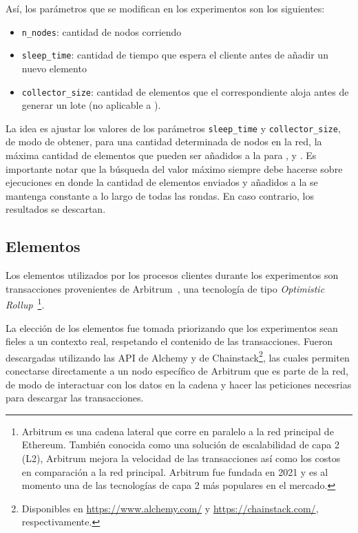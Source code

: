 \bigskip

Así, los parámetros que se modifican en los experimentos son los siguientes:
\begin{itemize}
	\item \texttt{n\_nodes}: cantidad de nodos corriendo
	\item \texttt{sleep\_time}: cantidad de tiempo que espera el cliente antes de añadir un nuevo elemento
	\item \texttt{collector\_size}: cantidad de elementos que el correspondiente \collector aloja antes de generar
	un lote (no aplicable a \vanilla).
\end{itemize}
La idea es ajustar los valores de los parámetros \texttt{sleep\_time} y \texttt{collector\_size},
de modo de obtener, para una cantidad determinada de nodos en la red, la máxima cantidad de elementos que pueden ser
añadidos a la \setchain para \vanilla, \compresschain y \hashchain.
Es importante notar que la búsqueda del valor máximo siempre debe hacerse sobre ejecuciones en donde la cantidad de elementos
enviados y añadidos a la \setchain se mantenga constante a lo largo de todas las rondas.
En caso contrario, los resultados se descartan.


\subsection{Elementos}
Los elementos utilizados por los procesos clientes durante los experimentos son transacciones provenientes
de Arbitrum~\cite{Kalodner2018Arbitrum}, una tecnología de tipo \textit{Optimistic Rollup}~\footnote{
Arbitrum es una cadena lateral que corre en paralelo a la red principal de Ethereum.
También conocida como una solución de escalabilidad de capa 2 (L2), Arbitrum mejora la velocidad de las transacciones así
como los costos en comparación a la red principal.
Arbitrum fue fundada en 2021 y es al momento una de las tecnologías de capa 2 más populares en el mercado.}.
%

La elección de los elementos fue tomada priorizando que los experimentos sean fieles a un contexto
real, respetando el contenido de las transacciones.
%
Fueron descargadas utilizando las API de Alchemy y de Chainstack\footnote{Disponibles en \url{https://www.alchemy.com/} y \url{https://chainstack.com/},
respectivamente.}, las
cuales permiten conectarse directamente a un nodo específico de Arbitrum que es parte de la red,
de modo de interactuar con los datos en la cadena y hacer las peticiones necesrias para descargar las transacciones.

